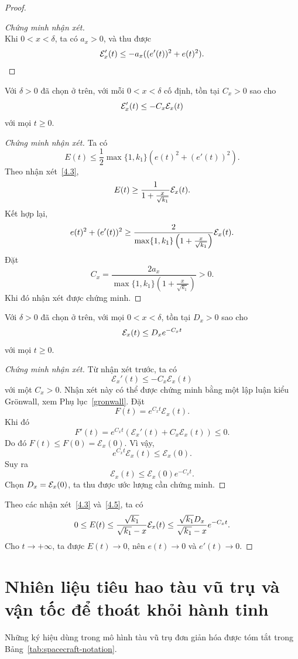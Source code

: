 ﻿\documentclass[12pt]{article}
\begin{document}
\begin{proof}
\begin{proof}[Chứng minh nhận xét]
\[\]
Khi $0 < x < \delta$, ta có $a_x > 0$, và thu được
\[
 \mathcal{E}'_x(t) \leq - a_x((e'(t))^2 + e(t)^2).
\]
\end{proof}
\begin{claim}
   Với $\delta > 0$ đã chọn ở trên, với mỗi $0 < x < \delta$ cố định, tồn tại $C_x > 0$ sao cho
    \[
 \mathcal{E}'_x(t) \leq - C_x\mathcal{E}_x(t)
 \]
    với mọi $t \geq 0$.
\end{claim}
\begin{proof}[Chứng minh nhận xét]
    Ta có
    \[
 E(t) \leq \frac{1}{2}\max\{1, k_1\}\left(e(t)^2 + (e'(t))^2\right).
 \]
    Theo nhận xét~\ref{4.3},
    \[
 E(t) \geq \frac{1}{1 + \frac{x}{\sqrt{k_1}}}\mathcal{E}_x(t).
 \]
    Kết hợp lại,
    \[
 e(t)^2 + (e'(t))^2 \geq \frac{2}{\max\{1, k_1\}\left(1 + \frac{x}{\sqrt{k_1}}\right)}
 \mathcal{E}_x(t).
 \]
    Đặt
    \[
 C_x
 =
 \frac{2a_x}{\max\{1, k_1\}\left(1 + \frac{x}{\sqrt{k_1}}\right)}
 > 0.
 \]
    Khi đó nhận xét được chứng minh.
\end{proof}
    \begin{claim}\label{4.5}
    Với $\delta > 0$ đã chọn ở trên, với mọi $0 < x < \delta$, tồn tại $D_x > 0$ sao cho
    \[
 \mathcal{E}_x(t) \leq D_xe^{-C_x t}
 \]
    với mọi $t \geq 0$.
    \end{claim}
    \begin{proof}[Chứng minh nhận xét]
Từ nhận xét trước, ta có
\[
 \mathcal E_x'(t)\le - C_x\mathcal E_x(t)
\]
với một $C_x > 0$. Nhận xét này có thể được chứng minh bằng một lập luận kiểu Grönwall, xem Phụ lục~\ref{gronwall}. Đặt
\[
 F(t) = e^{C_xt}\mathcal E_x(t).
\]
Khi đó
\[
 F'(t)
 =
 e^{C_xt}\left(\mathcal E_x'(t) + C_x\mathcal E_x(t)\right)
 \le 0.
\]
Do đó $F(t)\le F(0) = \mathcal E_x(0)$. Vì vậy,
\[
 e^{C_xt}\mathcal E_x(t)\le \mathcal E_x(0).
\]
Suy ra
\[
 \mathcal E_x(t)\le \mathcal E_x(0)e^{-C_xt}.
\]
Chọn $D_x = \mathcal{E}_x(0)$, ta thu được ước lượng cần chứng minh.
\end{proof}
Theo các nhận xét~\ref{4.3} và~\ref{4.5}, ta có
\[
 0 \leq E(t) \leq \frac{\sqrt{k_1}}{\sqrt{k_1} - x}\mathcal{E}_x(t) \leq \frac{\sqrt{k_1}D_x}{\sqrt{k_1} - x}e^{-C_xt}.
\]
Cho $t \to + \infty$, ta được $E(t) \to 0$, nên $e(t) \to 0$ và $e'(t) \to 0$.
\end{proof}
\section{Nhiên liệu tiêu hao tàu vũ trụ và vận tốc để thoát khỏi hành tinh}
Những ký hiệu dùng trong mô hình tàu vũ trụ đơn giản hóa được tóm tắt trong Bảng~\ref{tab:spacecraft-notation}.
\end{document}
